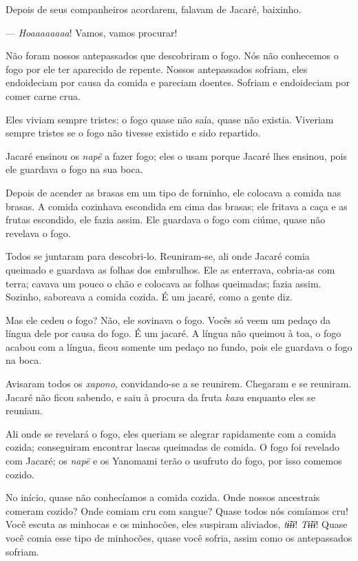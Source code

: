 Depois de seus companheiros acordarem, falavam de Jacaré, baixinho. 

--- \textit{Hoaaaaaaaa}! Vamos, vamos procurar! 

Não foram nossos antepassados que descobriram o fogo. Nós não conhecemos
 o fogo por ele ter aparecido de repente. Nossos antepassados sofriam,
 eles endoideciam por causa da comida e pareciam doentes. Sofriam e
 endoideciam por comer carne crua. 


Eles viviam sempre tristes; o fogo quase não saía, quase não existia.
 Viveriam sempre tristes se o fogo não tivesse existido e sido
 repartido.

Jacaré ensinou os \textit{napë} a fazer fogo; eles o usam porque Jacaré
lhes ensinou, pois ele guardava o fogo na sua boca.

Depois de acender as brasas em um tipo de forninho, ele colocava a
 comida nas brasas. A comida cozinhava escondida em cima das brasas; ele
 fritava a caça e as frutas escondido, ele fazia assim. Ele
 guardava o fogo com ciúme, quase não revelava o fogo. 

Todos se juntaram para descobri-lo. Reuniram-se, ali onde Jacaré comia
queimado e guardava as folhas dos embrulhos. Ele as enterrava, cobria-as
com terra; cavava um pouco o chão e colocava as folhas queimadas; fazia assim. Sozinho, saboreava a comida cozida. É um jacaré, como a gente
diz.

Mas ele cedeu o fogo? Não, ele sovinava o fogo. Vocês só veem um pedaço
da língua dele por causa do fogo. É um jacaré. A língua não queimou à
toa, o fogo acabou com a língua, ficou somente um pedaço no fundo, pois
ele guardava o fogo na boca. 

Avisaram todos os \textit{xapono}, convidando-se a se reunirem. Chegaram e se
reuniram. Jacaré não ficou sabendo, e saiu à procura da
fruta \textit{kaxa} enquanto eles se reuniam. 

Ali onde se revelará o fogo, eles queriam se alegrar rapidamente com a comida
cozida; conseguiram encontrar lascas queimadas de comida. O fogo foi revelado com Jacaré; os \textit{napë} e os Yanomami terão o usufruto do fogo,
por isso comemos cozido.

No início, quase não conhecíamos a comida cozida. Onde nossos ancestrais
 comeram cozido? Onde comiam cru com sangue? Quase todos nós comíamos
 cru! Você escuta as minhocas e os minhocões, eles suspiram
 aliviados, \textit{tɨ̃ɨɨ}! \textit{Tɨ̃ɨɨ}! Quase você comia esse tipo de
 minhocões, quase você sofria, assim como os antepassados sofriam. 

